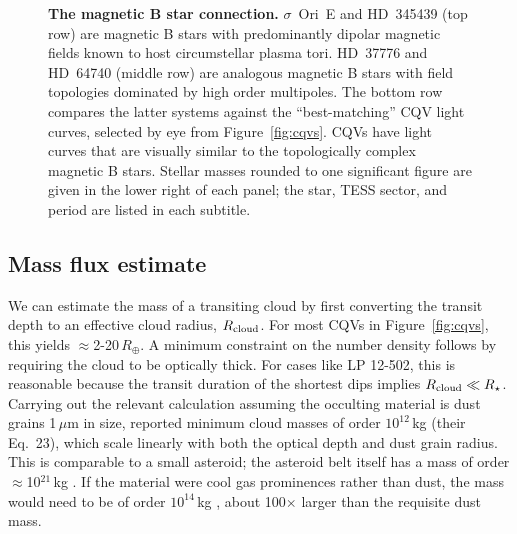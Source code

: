 \documentclass[11pt,twocolumn,tighten]{aastex63}
\begin{document}
\begin{figure}[!th]
	\begin{center}
		\centering
			
		\vspace{-0.35cm}

		\vspace{-0.35cm}

		\vspace{-0.1cm}
		\caption{
      {\bf The magnetic B star connection.}
      $\sigma$~Ori~E and HD~345439 (top row) are magnetic B stars with
      predominantly dipolar magnetic fields known to host
      circumstellar plasma tori.  HD~37776 and HD~64740 (middle row)
      are analogous magnetic B stars with field topologies dominated by
      high order multipoles.  The bottom row compares the latter
      systems against the ``best-matching'' CQV light curves, selected
      by eye from Figure~\ref{fig:cqvs}.  CQVs have light curves that
      are visually similar to the topologically complex magnetic B
      stars.  Stellar masses rounded to one significant figure are
      given in the lower right of each panel; the star, TESS sector,
      and period are listed in each subtitle.
		}
		\label{fig:bstar}
	\end{center}
\end{figure}


\subsection{Mass flux estimate}
\label{subsec:massflux}

We can estimate the mass of a transiting cloud by first converting the
transit depth to an effective cloud radius, $R_{\rm cloud}$.  For most
CQVs in Figure~\ref{fig:cqvs}, this yields $\approx$2-20\,$R_\oplus$.
A minimum constraint on the number density follows by requiring the
cloud to be optically thick.  For cases like LP 12-502, this is
reasonable because the transit duration of the shortest dips implies
$R_{\rm cloud}\ll R_\star$.  Carrying out the relevant calculation
assuming the occulting material is dust grains 1\,$\mu$m in size,
\citet{2023MNRAS.518.4734S} reported minimum cloud masses of order
$10^{12}$\,kg (their Eq.~23), which scale linearly with both the
optical depth and dust grain radius.  This is comparable to a small
asteroid; the asteroid belt itself has a mass of order
$\approx$10$^{21}$\,kg \citep{2019Icar..319..812P}.  If the material
were cool gas prominences rather than dust, the mass would need to be
of order $10^{14}$\,kg \citep{1990MNRAS.247..415C}, about 100$\times$
larger than the requisite dust mass.
\end{document}
